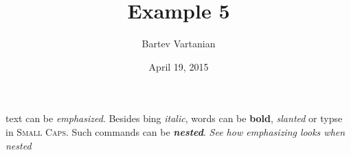 \documentclass{article}
\begin{document}
\title{Example 5}
\author{Bartev Vartanian}
\date{April 19, 2015}

\maketitle
text can be \emph{emphasized}.
Besides bing \emph{italic}, words can be \textbf{bold},
\textsl{slanted} or typse in \textsc{Small Caps}.
Such commands can be  \textit{\textbf{nested}}.
\emph{See how \emph{emphasizing} looks when nested}
\end{document}
